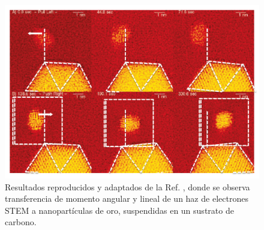 \begin{figure}[h!]
\centering
\includegraphics[width=0.6\linewidth]{17-imagenes/1-Intro/Batson}
\caption{\label{fig: Batson momentum transfer} Resultados reproducidos y adaptados de la Ref. \cite{Batson}, donde se observa transferencia de momento angular y lineal de un haz de electrones STEM a nanopartículas de oro, suspendidas en un sustrato de carbono.} 
\end{figure}


